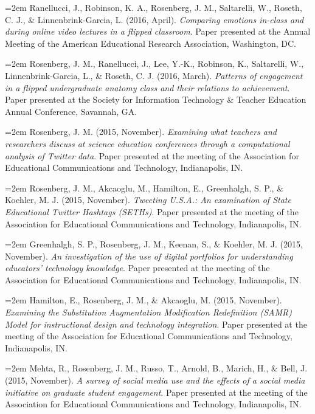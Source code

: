 \documentclass[
  14,
]{article}
\begin{document}
\hangindent=2em Ranellucci, J., Robinson, K. A., Rosenberg, J. M.,
Saltarelli, W., Roseth, C. J., \& Linnenbrink-Garcia, L. (2016, April).
\emph{Comparing emotions in-class and during online video lectures in a
flipped classroom}. Paper presented at the Annual Meeting of the
American Educational Research Association, Washington, DC.

\hangindent=2em Rosenberg, J. M., Ranellucci, J., Lee, Y.-K., Robinson,
K., Saltarelli, W., Linnenbrink-Garcia, L., \& Roseth, C. J. (2016,
March). \emph{Patterns of engagement in a flipped undergraduate anatomy
class and their relations to achievement}. Paper presented at the
Society for Information Technology \& Teacher Education Annual
Conference, Savannah, GA.

\hangindent=2em Rosenberg, J. M. (2015, November). \emph{Examining what
teachers and researchers discuss at science education conferences
through a computational analysis of Twitter data}. Paper presented at
the meeting of the Association for Educational Communications and
Technology, Indianapolis, IN.

\hangindent=2em Rosenberg, J. M., Akcaoglu, M., Hamilton, E.,
Greenhalgh, S. P., \& Koehler, M. J. (2015, November). \emph{Tweeting
U.S.A.: An examination of State Educational Twitter Hashtags (SETHs)}.
Paper presented at the meeting of the Association for Educational
Communications and Technology, Indianapolis, IN.

\hangindent=2em Greenhalgh, S. P., Rosenberg, J. M., Keenan, S., \&
Koehler, M. J. (2015, November). \emph{An investigation of the use of
digital portfolios for understanding educators' technology knowledge}.
Paper presented at the meeting of the Association for Educational
Communications and Technology, Indianapolis, IN.

\hangindent=2em Hamilton, E., Rosenberg, J. M., \& Akcaoglu, M. (2015,
November). \emph{Examining the Substitution Augmentation Modification
Redefinition (SAMR) Model for instructional design and technology
integration}. Paper presented at the meeting of the Association for
Educational Communications and Technology, Indianapolis, IN.

\hangindent=2em Mehta, R., Rosenberg, J. M., Russo, T., Arnold, B.,
Marich, H., \& Bell, J. (2015, November). \emph{A survey of social media
use and the effects of a social media initiative on graduate student
engagement}. Paper presented at the meeting of the Association for
Educational Communications and Technology, Indianapolis, IN.
\end{document}
